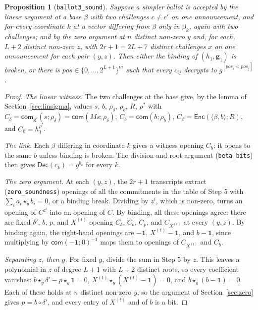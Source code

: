 \documentclass[11pt,a4paper]{article}
\newcommand{\Enc}{\mathsf{Enc}}
\newcommand{\Dec}{\mathsf{Dec}}
\newcommand{\com}{\mathsf{com}}
\newcommand{\pos}{\mathit{pos}}
\newcommand{\rocq}[1]{\texttt{#1}}
\newtheorem{proposition}[theorem]{Proposition}
\theoremstyle{remark}
\begin{document}
\begin{proposition}[\rocq{ballot3\_sound}]\label{prop:v3sound}
Suppose a simpler ballot is accepted by the linear argument at a base
$\beta$ with two challenges $c \ne c'$ on one announcement, and for every
coordinate $k$ at a vector differing from $\beta$ only in $\beta_k$, again
with two challenges; and by the zero argument at $n$ distinct non-zero $y$
and, for each, $L + 2$ distinct non-zero $z$, with $2r + 1 = 2L + 7$ distinct
challenges $x$ on one announcement for each pair $(y, z)$. Then either the
binding of $(h_1, \mathbf{g}_1)$ is broken, or there is $\pos \in \{0,
\ldots, 2^{L+1}\}^m$ such that every $c_{ij}$ decrypts to
$g^{[\pos_i < \pos_j]}$.
\end{proposition}
\begin{proof}
\emph{The linear witness.} The two challenges at the base give, by the
lemma of Section~\ref{sec:linsigma}, values $s$, $b$, $\rho_\delta$,
$\rho_b$, $R$, $\rho^*$ with $C_\delta = \com_{\mathbf{g}'}(s; \rho_\delta)
= \com(Ms; \rho_\delta)$, $C_b = \com(b; \rho_b)$, $C_\beta = \Enc(\langle
\beta, b \rangle; R)$, and $C_0 = h_1^{\rho^*}$.

\emph{The link.} Each $\beta$ differing in coordinate $k$ gives a witness
opening $C_b$; it opens to the same $b$ unless binding is broken. The
division-and-root argument (\rocq{beta\_bits}) then gives $\Dec(c_k) =
g^{b_k}$ for every $k$.

\emph{The zero argument.} At each $(y, z)$, the $2r + 1$ transcripts
extract (\rocq{zero\_soundness}) openings of all the commitments in the
table of Step 5 with $\sum_i a_i \star_y b_i = 0$, or a binding break.
Dividing by $z^{i}$, which is non-zero, turns an opening of $C^{z^{i}}$
into an opening of $C$. By binding, all these openings agree: there are
fixed $\delta'$, $b$, $p$, and $X^{(t)}$ opening $C_\delta$, $C_b$, $C_p$,
and $C_{X^{(t)}}$ at every $(y, z)$. By binding again, the right-hand
openings are $-\mathbf{1}$, $X^{(t)} - \mathbf{1}$, and $b - \mathbf{1}$,
since multiplying by $\com(-\mathbf{1}; 0)^{-1}$ maps them to openings of
$C_{X^{(t)}}$ and $C_b$.

\emph{Separating $z$, then $y$.} For fixed $y$, divide the sum in Step 5
by $z$. This leaves a polynomial in $z$ of degree $L + 1$ with $L + 2$
distinct roots, so every coefficient vanishes: $b \star_y \delta' - p
\star_y \mathbf{1} = 0$, $X^{(t)} \star_y (X^{(t)} - \mathbf{1}) = 0$, and
$b \star_y (b - \mathbf{1}) = 0$. Each of these holds at $n$ distinct
non-zero $y$, so the argument of Section~\ref{sec:zero} gives $p = b \circ
\delta'$, and every entry of $X^{(t)}$ and of $b$ is a bit.


\end{proof}
\end{document}
